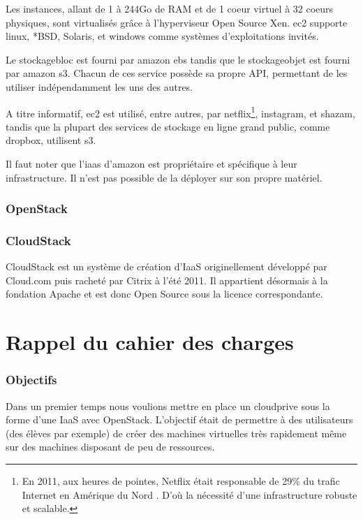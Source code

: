 \documentclass[a4paper,oneside]{report}
\begin{document}
Les instances, allant de 1 à 244Go de RAM et de 1 coeur virtuel à 32 coeurs physiques, sont virtualisés grâce à l'hyperviseur Open Source Xen.
\gls{ec2} supporte \gls{linux}, *BSD, Solaris, et \gls{windows} comme systèmes d'exploitations invités.

Le \gls{stockagebloc} est fourni par \gls{amazon} \gls{ebs} tandis que le \gls{stockageobjet} est fourni par \gls{amazon} \gls{s3}.
Chacun de ces service possède sa propre API, permettant de les utiliser indépendamment les uns des autres.

A titre informatif, \gls{ec2} est utilisé, entre autres, par \gls{netflix}\footnote{En 2011, aux heures de pointes, Netflix était responsable de 29\% du trafic Internet en Amérique du Nord \cite{NetflixTrafic}. D'où la nécessité d'une infrastructure robuste et scalable.}, \gls{instagram}, et \gls{shazam}, tandis que la plupart des services de stockage en ligne grand public, comme \gls{dropbox}, utilisent \gls{s3}.

Il faut noter que l'\gls{iaas} d'\gls{amazon} est propriétaire et spécifique à leur infrastructure. Il n'est pas possible de la déployer sur son propre matériel.

\subsubsection{OpenStack}

\subsubsection{CloudStack}
CloudStack est un système de création d'IaaS originellement développé par Cloud.com puis racheté par Citrix à l'été 2011.
Il appartient désormais à la fondation Apache et est donc Open Source sous la licence correspondante.\newline


\section{Rappel du cahier des charges}
\subsubsection{Objectifs}
Dans un premier temps nous voulions mettre en place un \gls{cloudprive} sous la forme d'une IaaS avec OpenStack.
L'objectif était de permettre à des utilisateurs (des élèves par exemple) de créer des machines virtuelles très rapidement même sur des machines disposant de peu de ressources.\\
\end{document}
